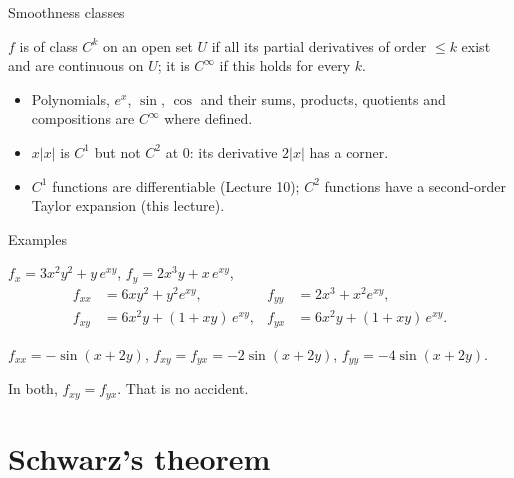\documentclass[10pt]{wosm-slides}
\begin{document}
\begin{frame}{Smoothness classes}
  \begin{definition}
    $f$ is of class $C^k$ on an open set $U$ if all its partial derivatives of order $\le k$ exist
    and are continuous on $U$; it is $C^\infty$ if this holds for every $k$.
  \end{definition}
  \begin{itemize}
    \item Polynomials, $e^x$, $\sin$, $\cos$ and their sums, products, quotients and compositions are
      $C^\infty$ where defined.
    \item $x|x|$ is $C^1$ but not $C^2$ at $0$: its derivative $2|x|$ has a corner.
    \item $C^1$ functions are differentiable (Lecture 10); $C^2$ functions have a second-order Taylor
      expansion (this lecture).
  \end{itemize}
\end{frame}

\begin{frame}{Examples}
  \begin{example}[$f(x, y) = x^3 y^2 + e^{xy}$]
    $f_x = 3x^2 y^2 + y\, e^{xy}$, \quad $f_y = 2x^3 y + x\, e^{xy}$,
    \begin{align*}
      f_{xx} &= 6xy^2 + y^2 e^{xy}, & f_{yy} &= 2x^3 + x^2 e^{xy}, \\
      f_{xy} &= 6x^2 y + (1 + xy)\, e^{xy}, & f_{yx} &= 6x^2 y + (1 + xy)\, e^{xy} .
    \end{align*}
  \end{example}
  \pause
  \begin{example}[$f(x, y) = \sin(x + 2y)$]
    $f_{xx} = -\sin(x + 2y)$, \quad $f_{xy} = f_{yx} = -2\sin(x + 2y)$, \quad $f_{yy} = -4\sin(x + 2y)$.
  \end{example}
  \pause
  {\small In both, $f_{xy} = f_{yx}$. That is no accident.\par}
\end{frame}

\section{Schwarz's theorem}
\end{document}
